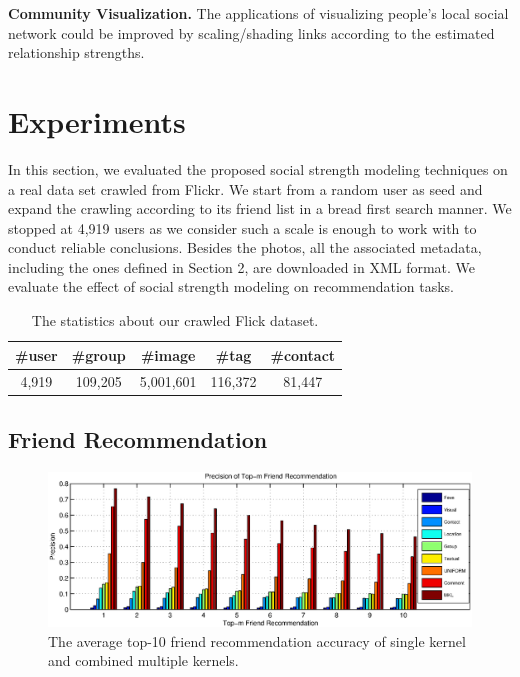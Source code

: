 {\bf Community Visualization.} The applications of visualizing people's local social network could be improved by scaling/shading links according to the
estimated relationship strengths.

\section{Experiments} \label{sec:ssm-experiment}

In this section, we evaluated the proposed social strength modeling techniques on a real data set crawled from Flickr. We start from a random user as seed and
expand the crawling according to its friend list in a bread first search manner. We stopped at 4,919 users as we consider such a scale is enough to work with to
conduct reliable conclusions. Besides the photos, all the associated metadata, including the ones defined in Section 2, are downloaded in XML format. We
evaluate the effect of social strength modeling on recommendation tasks.

\begin{table}[!tb]
\label{table:dataset}
\caption{The statistics about our crawled Flick dataset.}
\begin{center}
\begin{tabular}{|c|c|c|c|c|}
\hline
\#user    &\#group &\#image &\#tag &\#contact\\
\hline
\hline
4,919   &109,205    &5,001,601  &116,372 &81,447\\
\hline
\end{tabular}
\end{center}
\vspace{-3mm}
\end{table}

\subsection{Friend Recommendation}

\begin{figure}[!ht]
\includegraphics[width=\linewidth]{figures/friend.eps}
\caption{The average top-10 friend recommendation accuracy of single kernel and combined multiple kernels.}
\end{figure}

